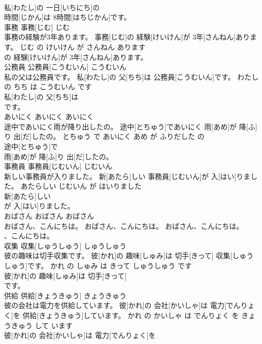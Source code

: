 \documentclass[8pt]{extreport}
\begin{document}
\begin{CJK}{UTF8}{min}
\\	私[わたし]の 一日[いちにち]の
\\	時間[じかん]は 8時間[はちじかん]です。			
\\	事務	事務[じむ]	じむ	
\\	事務の経験が3年あります。	事務[じむ]の 経験[けいけん]が 3年[さんねん]あります。	じむ の けいけん が さんねん あります	
\\	の 経験[けいけん]が 3年[さんねん]あります。			
\\	公務員	公務員[こうむいん]	こうむいん	
\\	私の父は公務員です。	私[わたし]の 父[ちち]は 公務員[こうむいん]です。	わたし の ちち は こうむいん です	
\\	私[わたし]の 父[ちち]は
\\	です。			
\\	あいにく	あいにく	あいにく	
\\	途中であいにく雨が降り出したの。	途中[とちゅう]であいにく 雨[あめ]が 降[ふ]り 出[だ]したの。	とちゅう で あいにく あめ が ふりだした の	
\\	途中[とちゅう]で
\\	雨[あめ]が 降[ふ]り 出[だ]したの。			
\\	事務員	事務員[じむいん]	じむいん	
\\	新しい事務員が入りました。	新[あたら]しい 事務員[じむいん]が 入[はい]りました。	あたらしい じむいん が はいりました	
\\	新[あたら]しい
\\	が 入[はい]りました。			
\\	おばさん	おばさん	おばさん	
\\	おばさん、こんにちは。	おばさん、こんにちは。	おばさん、こんにちは。	
\\	、こんにちは。			
\\	収集	収集[しゅうしゅう]	しゅうしゅう	
\\	彼の趣味は切手収集です。	彼[かれ]の 趣味[しゅみ]は 切手[きって] 収集[しゅうしゅう]です。	かれ の しゅみ は きって しゅうしゅう です	
\\	彼[かれ]の 趣味[しゅみ]は 切手[きって]
\\	です。			
\\	供給	供給[きょうきゅう]	きょうきゅう	
\\	彼の会社は電力を供給しています。	彼[かれ]の 会社[かいしゃ]は 電力[でんりょく]を 供給[きょうきゅう]しています。	かれ の かいしゃ は でんりょく を きょうきゅう して います	
\\	彼[かれ]の 会社[かいしゃ]は 電力[でんりょく]を

\end{CJK}
\end{document}
